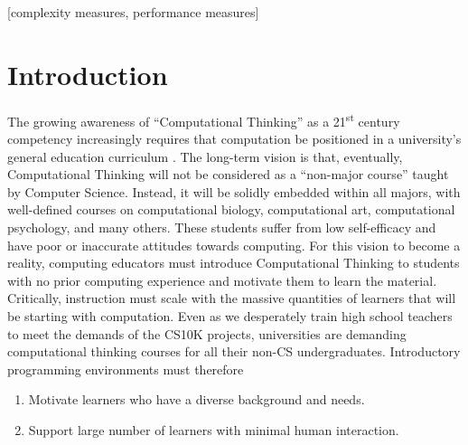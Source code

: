\documentclass{sig-alternate}
\begin{document}
\maketitle
\begin{abstract}

\end{abstract}

[complexity measures, performance measures]



\section{Introduction}

The growing awareness of ``Computational Thinking'' as a 21\textsuperscript{st} century competency increasingly requires that computation be positioned in a university's general education curriculum \cite{wing2006computational}.
The long-term vision is that, eventually, Computational Thinking will not be considered as a ``non-major course'' taught by Computer Science.
Instead, it will be solidly embedded within all majors, with well-defined courses on computational biology, computational art, computational psychology, and many others.
These students suffer from low self-efficacy and have poor or inaccurate attitudes towards computing.
For this vision to become a reality, computing educators must introduce Computational Thinking to students with no prior computing experience and motivate them to learn the material.
Critically, instruction must scale with the massive quantities of learners that will be starting with computation.
Even as we desperately train high school teachers to meet the demands of the CS10K projects, universities are demanding computational thinking courses for all their non-CS undergraduates.
Introductory programming environments must therefore
\begin{enumerate}
	\item Motivate learners who have a diverse background and needs.
	\item Support large number of learners with minimal human interaction.
\end{enumerate}
\end{document}
